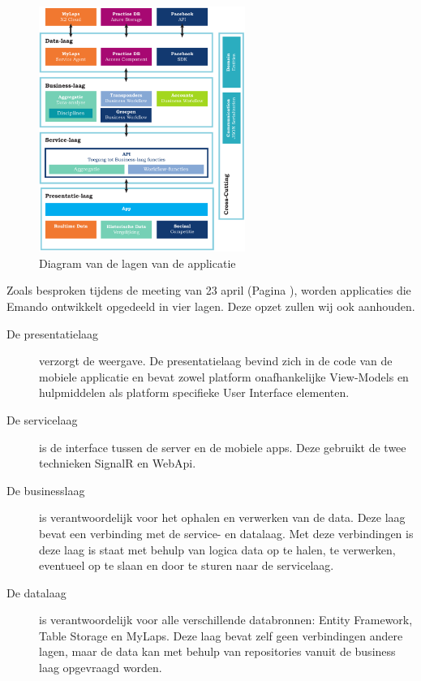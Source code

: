 \begin{figure}
  \includegraphics[width=0.6\textwidth]{style/images/Layers}
  \caption{Diagram van de lagen van de applicatie}
  \label{fig:diagram-layers}
\end{figure}

Zoals besproken tijdens de meeting van 23 april (Pagina \pageref{sec:meeting-23-apr}), worden applicaties die Emando ontwikkelt opgedeeld in vier lagen. Deze opzet zullen wij ook aanhouden.

\begin{description}
\item[De presentatielaag] verzorgt de weergave. De presentatielaag bevind zich in de code van de mobiele applicatie en bevat zowel platform onafhankelijke View-Models en hulpmiddelen als platform specifieke User Interface elementen.
\item[De servicelaag] is de interface tussen de server en de mobiele apps. Deze gebruikt de twee technieken SignalR en WebApi.
\item[De businesslaag] is verantwoordelijk voor het ophalen en verwerken van de data. Deze laag bevat een verbinding met de service- en datalaag. Met deze verbindingen is deze laag is staat met behulp van logica data op te halen, te verwerken, eventueel op te slaan en door te sturen naar de servicelaag. 
\item[De datalaag] is verantwoordelijk voor alle verschillende databronnen: Entity Framework, Table Storage en MyLaps. Deze laag bevat zelf geen verbindingen andere lagen, maar de data kan met behulp van repositories vanuit de business laag opgevraagd worden.

\end{description}

